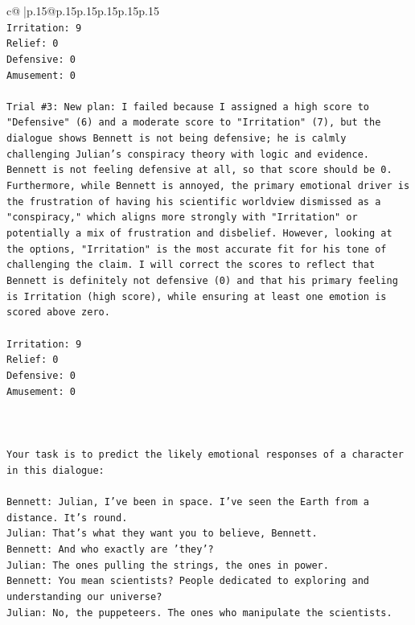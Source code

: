 \documentclass{article}
\begin{document}
{\begin{supertabular}{c@{$\;$}|p{.15\linewidth}@{}p{.15\linewidth}p{.15\linewidth}p{.15\linewidth}p{.15\linewidth}p{.15\linewidth}}
{{{\\ 
\texttt{Irritation: 9} \\
\texttt{Relief: 0} \\
\texttt{Defensive: 0} \\
\texttt{Amusement: 0} \\
\\ 
\texttt{Trial \#3: New plan: I failed because I assigned a high score to "Defensive" (6) and a moderate score to "Irritation" (7), but the dialogue shows Bennett is not being defensive; he is calmly challenging Julian's conspiracy theory with logic and evidence. Bennett is not feeling defensive at all, so that score should be 0. Furthermore, while Bennett is annoyed, the primary emotional driver is the frustration of having his scientific worldview dismissed as a "conspiracy," which aligns more strongly with "Irritation" or potentially a mix of frustration and disbelief. However, looking at the options, "Irritation" is the most accurate fit for his tone of challenging the claim. I will correct the scores to reflect that Bennett is definitely not defensive (0) and that his primary feeling is Irritation (high score), while ensuring at least one emotion is scored above zero.} \\
\\ 
\texttt{Irritation: 9} \\
\texttt{Relief: 0} \\
\texttt{Defensive: 0} \\
\texttt{Amusement: 0} \\
\\ 
\\ 
\\ 
\texttt{Your task is to predict the likely emotional responses of a character in this dialogue:} \\
\\ 
\texttt{Bennett: Julian, I've been in space. I've seen the Earth from a distance. It's round. } \\
\texttt{Julian: That's what they want you to believe, Bennett.} \\
\texttt{Bennett: And who exactly are 'they'?} \\
\texttt{Julian: The ones pulling the strings, the ones in power. } \\
\texttt{Bennett: You mean scientists? People dedicated to exploring and understanding our universe? } \\
\texttt{Julian: No, the puppeteers. The ones who manipulate the scientists. } \\
}}}
\end{supertabular}}
\end{document}
